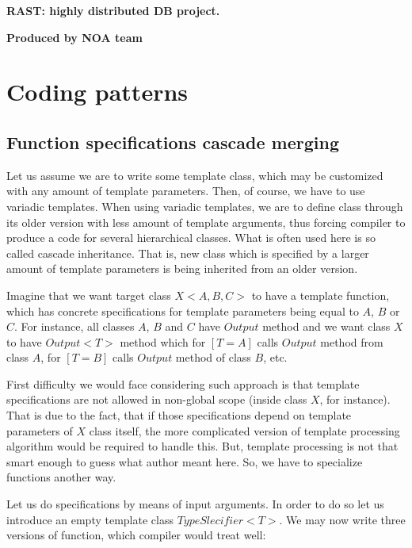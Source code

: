 \documentclass{article}
\begin{document}

\begin{center}
 \Large{\bf RAST: highly distributed DB project.}

{\large {\bf Produced by NOA team}}
\end{center}

\tableofcontents

\newpage
\section{Coding patterns}
\subsection{Function specifications cascade merging}
\label{subsec:specifications_cascade_merging}

Let us assume we are to write some template class, which may be customized with any amount of template parameters. Then, of course, we have to use variadic templates. When using variadic templates, we are to define class through its older version with less amount of template arguments, thus forcing compiler to produce a code for several hierarchical classes. What is often used here is so called cascade inheritance. That is, new class which is specified by a larger amount of template parameters is being inherited from an older version.

Imagine that we want target class $X<A,B,C>$ to have a template function, which has concrete specifications for template parameters being equal to $A$, $B$ or $C$. For instance, all classes $A$, $B$ and $C$ have $Output$ method and we want class $X$ to have $Output<T>$ method which for $[T=A]$ calls $Output$ method from class $A$, for $[T=B]$ calls $Output$ method of class $B$, etc.

First difficulty we would face considering such approach is that template specifications are not allowed in non-global scope (inside class $X$, for instance). That is due to the fact, that if those specifications depend on template parameters of $X$ class itself, the more complicated version of template processing algorithm would be required to handle this. But, template processing is not that smart enough to guess what author meant here. So, we have to specialize functions another way.

Let us do specifications by means of input arguments. In order to do so let us introduce an empty template class $TypeSlecifier<T>$. We may now write three versions of function, which compiler would treat well:
\end{document}
